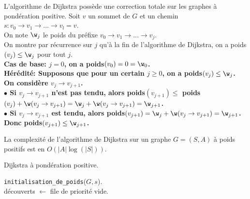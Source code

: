 \documentclass[french, 11pt]{article}
\begin{document}
\begin{thm}{}{}
    L'algorithme de Dijkstra possède une correction totale sur les graphes à pondération positive.
    \tcblower
    Soit $v$ un sommet de $G$ et un chemin $s:v_0\to v_1 \to ... \to v_l = v$.\\
    On note $\w_j$ le poids du préfixe $v_0\to v_1 \to ... \to v_j$.\\
    On montre par récurrence sur $j$ qu'à la fin de l'algorithme de Dijkstra, on a poids$(v_j)\leq \w_j$ pour tout $j$.\\
    \bf{Cas de base:} $j=0$, on a poids$(v_0)=0=\w_0$.\\
    \bf{Hérédité:} Supposons que pour un certain $j\geq0$, on a poids$(v_j)\leq \w_j$.\\
    On considère $v_j\to v_{j+1}$.\\
    $\bullet$ Si $v_j\to v_{j+1}$ n'est pas tendu, alors poids$(v_{j+1})\leq$ poids$(v_j)+\w(v_j\to v_{j+1})=\w_j+\w(v_j\to v_{j+1})=\w_{j+1}$.\\
    $\bullet$ Si $v_j\to v_{j+1}$ est tendu, alors poids$(v_{j+1})=\w_j+\w(v_j\to v_{j+1})=\w_{j+1}$.\\
    Donc poids$(v_{j+1})\leq \w_{j+1}$.
\end{thm}

\begin{thm}{}{}
    La complexité de l'algorithme de Dijkstra sur un graphe $G=(S,A)$ à poids positifs est en $O(|A|\log(|S|))$.
\end{thm}

\begin{defi}{Dijkstra à pondération positive.}{}
    \begin{algorithm}[H]
        \caption{Algorithme de Dijkstra}
        \texttt{initialisation\_de\_poids}($G,s$).\\
        découverts $\gets$ file de priorité vide.\\
    \end{algorithm}
\end{defi}
\end{document}
